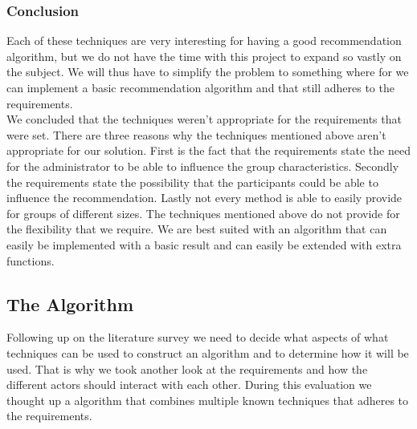 \subsubsection*{Conclusion}
Each of these techniques are very interesting for having a good recommendation algorithm, but we do not have the time with this project to expand so vastly on the subject.
We will thus have to simplify the problem to something where for we can implement a basic recommendation algorithm and that still adheres to the requirements.\\
We concluded that the techniques weren't appropriate for the requirements that were set.
There are three reasons why the techniques mentioned above aren't appropriate for our solution.
First is the fact that the requirements state the need for the administrator to be able to influence the group characteristics.
Secondly the requirements state the possibility that the participants could be able to influence the recommendation.
Lastly not every method is able to easily provide for groups of different sizes.
The techniques mentioned above do not provide for the flexibility that we require.
We are best suited with an algorithm that can easily be implemented with a basic result and can easily be extended with extra functions.

\subsection*{The Algorithm}
Following up on the literature survey we need to decide what aspects of what techniques can be used to construct an algorithm and to determine how it will be used.
That is why we took another look at the requirements and how the different actors should interact with each other.
During this evaluation we thought up a algorithm that combines multiple known techniques that adheres to the requirements.


